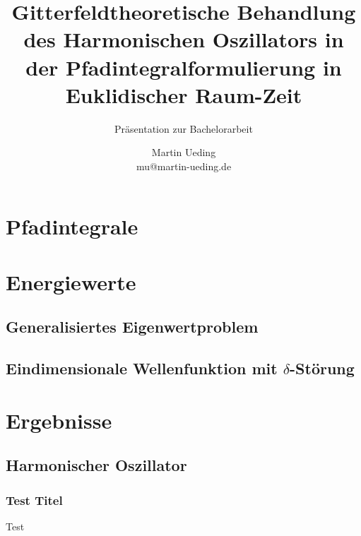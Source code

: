 \documentclass[11pt, ngerman, fleqn]{beamer}
\title{Gitterfeldtheoretische Behandlung des Harmonischen Oszillators in der Pfadintegralformulierung in Euklidischer Raum-Zeit}
\subtitle{Präsentation zur Bachelorarbeit}
\author{
    Martin Ueding \\ mu@martin-ueding.de
}
\begin{document}
\begin{frame}
    \titlepage
\end{frame}

\begin{frame}
    \tableofcontents
\end{frame}

\section{Pfadintegrale}

\section{Energiewerte}

\subsection{Generalisiertes Eigenwertproblem}

\subsection{Eindimensionale Wellenfunktion mit $\delta$-Störung}


\section{Ergebnisse}

\subsection{Harmonischer Oszillator}

\begin{frame}
    \frametitle{Test Titel}
   Test 
\end{frame}
\end{document}
